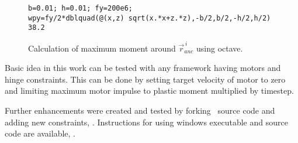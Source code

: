 \begin{figure}[htb!]
\centering
\lstset{language=octave}
\begin{lstlisting}
b=0.01; h=0.01; fy=200e6;
wpy=fy/2*dblquad(@(x,z) sqrt(x.*x+z.*z),-b/2,b/2,-h/2,h/2)
38.2
\end{lstlisting}

\caption{Calculation of maximum moment  around $\vec{r}_{anc}^{\,i} $ using octave.}
\label{fig:octave-mp}
\end{figure}


Basic idea in this work can be tested with any framework having motors and hinge constraints.
This can be done by setting target velocity of motor to zero and limiting maximum motor impulse to plastic moment 
multiplied by timestep.

Further enhancements were created and tested by forking \bullet\ source code
and adding new constraints, \cite{pbullet}.
Instructions for using  windows executable and  source code are available, \cite{bp}.

